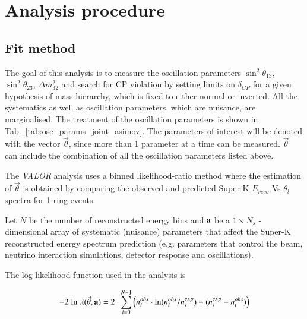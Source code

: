 \clearpage

\section {Analysis procedure}
\label{sec:oscfit}

\subsection {Fit method}
\label{sec:oscfit_method}

The goal of this analysis is to measure the oscillation parameters
$\sin^2 \theta_{13}$, $\sin^2 \theta_{23}$, $\Delta m^2_{32}$ and
search for CP violation by setting limits on $\delta_{CP}$
for a given hypothesis of mass hierarchy, which is fixed to either normal or inverted.
All the systematics as well as oscillation parameters, which are nuisance, are marginalised.
The treatment of the oscillation parameters is shown in Tab.~\ref{tab:osc_params_joint_asimov}.
The parameters of interest will be denoted with the vector $\vec{\theta}$,
since more than 1 parameter at a time can be measured.
$\vec{\theta}$ can include the combination of all the oscillation parameters listed above.


The {\em VALOR} analysis uses a binned likelihood-ratio method where
the estimation of $\vec{\theta}$ is obtained
by comparing the observed and predicted Super-K $E_{reco}$ Vs $\theta_l$ spectra
for 1-ring events.

Let $N$ be the number of reconstructed energy bins and
${\bf a}$ be a $1 \times N_{s}$ - dimensional array of systematic (nuisance) 
parameters that affect the Super-K reconstructed energy spectrum prediction (e.g.
parameters that control the beam, neutrino interaction simulations, 
detector response and oscillations).


The log-likelihood function used in the analysis is

\begin{equation} \label{eq:chisquare}
-2 \; \textrm{ln} \; \lambda (\vec{\theta},{\bf a}) = 2 \cdot \sum_{i=0}^{N-1} 
   \Big( 
     n^{obs}_{i} \cdot \textrm{ln} (n^{obs}_{i}/n^{exp}_{i}) +
     (n^{exp}_{i}-n^{obs}_{i}) 
   \Big) 
\end{equation}

